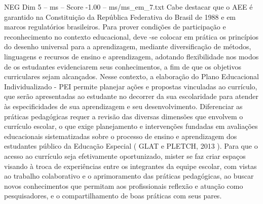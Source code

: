 \begin{textsample}{NEG Dim 5 – ms – Score -1.00 – ms/ms\_em\_7.txt}
Cabe destacar que o AEE é garantido na Constituição da República Federativa do Brasil de 1988 e em marcos regulatórios brasileiros.
Para prover condições de participação e reconhecimento no contexto educacional, deve -se colocar em prática os princípios do desenho universal para a aprendizagem, mediante diversificação de métodos, linguagens e recursos de ensino e aprendizagem, adotando flexibilidade nos modos de os estudantes evidenciarem seus conhecimentos, a fim de que os objetivos curriculares sejam alcançados.
Nesse contexto, a elaboração do Plano Educacional Individualizado - PEI permite planejar ações e propostas vinculadas ao currículo, que serão apresentadas ao estudante no decorrer da sua escolaridade para atender às especificidades de sua aprendizagem e seu desenvolvimento.
Diferenciar as práticas pedagógicas requer a revisão das diversas dimensões que envolvem o currículo escolar, o que exige planejamento e intervenções fundadas em avaliações educacionais sistematizadas sobre o processo de ensino e aprendizagem dos estudantes público da Educação Especial ( GLAT e PLETCH, 2013 ).
Para que o acesso ao currículo seja efetivamente oportunizado, mister se faz criar espaços visando à troca de experiências entre os integrantes da equipe escolar, com vistas ao trabalho colaborativo e o aprimoramento das práticas pedagógicas, ao buscar novos conhecimentos que permitam aos profissionais reflexão e atuação como pesquisadores, e o compartilhamento de boas práticas com seus pares.

\end{textsample}
